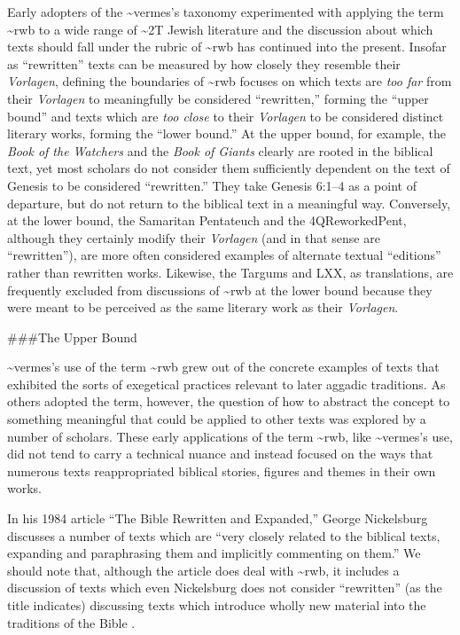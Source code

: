 Early adopters of the \textasciitilde{}vermes's taxonomy experimented
with applying the term \textasciitilde{}rwb to a wide range of
\textasciitilde{}2T Jewish literature and the discussion about which
texts should fall under the rubric of \textasciitilde{}rwb has continued
into the present. Insofar as ``rewritten'' texts can be measured by how
closely they resemble their \emph{Vorlagen}, defining the boundaries of
\textasciitilde{}rwb focuses on which texts are \emph{too far} from
their \emph{Vorlagen} to meaningfully be considered ``rewritten,''
forming the ``upper bound'' and texts which are \emph{too close} to
their \emph{Vorlagen} to be considered distinct literary works, forming
the ``lower bound.'' At the upper bound, for example, the \emph{Book of
the Watchers} and the \emph{Book of Giants} clearly are rooted in the
biblical text, yet most scholars do not consider them sufficiently
dependent on the text of Genesis to be considered ``rewritten.'' They
take Genesis 6:1--4 as a point of departure, but do not return to the
biblical text in a meaningful way. Conversely, at the lower bound, the
Samaritan Pentateuch and the 4QReworkedPent, although they certainly
modify their \emph{Vorlagen} (and in that sense are ``rewritten''), are
more often considered examples of alternate textual ``editions'' rather
than rewritten works. Likewise, the Targums and LXX, as translations,
are frequently excluded from discussions of \textasciitilde{}rwb at the
lower bound because they were meant to be perceived as the same literary
work as their \emph{Vorlagen}.

\#\#\#The Upper Bound

\textasciitilde{}vermes's use of the term \textasciitilde{}rwb grew out
of the concrete examples of texts that exhibited the sorts of exegetical
practices relevant to later aggadic traditions. As others adopted the
term, however, the question of how to abstract the concept to something
meaningful that could be applied to other texts was explored by a number
of scholars. These early applications of the term \textasciitilde{}rwb,
like \textasciitilde{}vermes's use, did not tend to carry a technical
nuance and instead focused on the ways that numerous texts
reappropriated biblical stories, figures and themes in their own works.

In his 1984 article ``The Bible Rewritten and Expanded,'' George
Nickelsburg discusses a number of texts which are ``very closely related
to the biblical texts, expanding and paraphrasing them and implicitly
commenting on them.''\autocite[89]{nickelsburg_stone1984} We should note
that, although the article does deal with \textasciitilde{}rwb, it
includes a discussion of texts which even Nickelsburg does not consider
``rewritten'' (as the title indicates) discussing texts which introduce
wholly new material into the traditions of the Bible
\autocite[89--90]{nickelsburg_stone1984}.

